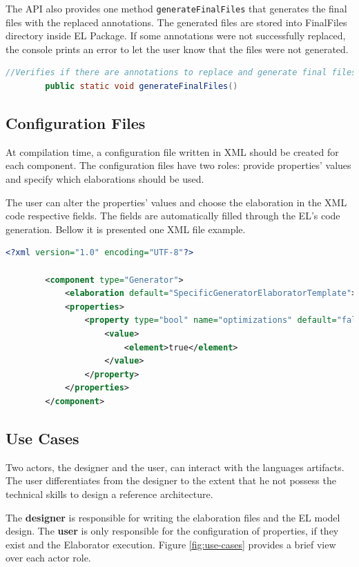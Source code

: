 \documentclass[11pt]{report}
\begin{document}
		\par The API also provides one method \texttt{generateFinalFiles} that generates the final files with the replaced annotations. The generated files are stored into FinalFiles directory inside EL Package. If some annotations were not successfully replaced, the console prints an error to let the user know that the files were not generated.
		
		\begin{lstlisting}[language=Java]
		//Verifies if there are annotations to replace and generate final files
		public static void generateFinalFiles()
		\end{lstlisting}		
		
		\subsection{Configuration Files}
		
		\par At compilation time, a configuration file written in XML should be created for each component. The configuration files have two roles: provide properties' values and specify which elaborations should be used.
		\par The user can alter the properties' values and choose the elaboration in the XML code respective fields. The fields are automatically filled through the EL's code generation. Bellow it is presented one XML file example.
		
		\begin{lstlisting}[language=XML]
		<?xml version="1.0" encoding="UTF-8"?>
		
		<component type="Generator">
			<elaboration default="SpecificGeneratorElaboratorTemplate">SpecificGeneratorElaborator</elaboration>
			<properties>
				<property type="bool" name="optimizations" default="false"> 
					<value>
						<element>true</element>
					</value>
				</property>
			</properties>
		</component>
		\end{lstlisting}
		
		\subsection{Use Cases}
		
		\par Two actors, the designer and the user, can interact with the languages artifacts. The user differentiates
		from the designer to the extent that he not possess the technical skills to design a reference architecture.
		\par The \textbf{designer} is responsible for writing the elaboration files and the EL model design. The \textbf{user} is only responsible for the configuration of properties, if they exist and the Elaborator execution. Figure \ref{fig:use-cases} provides a brief view over each actor role.
		
\end{document}
